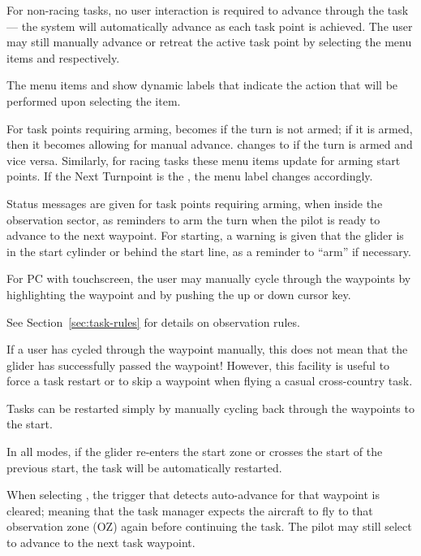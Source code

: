 For non-racing tasks, no user interaction is required to
advance through the task --- the system will automatically advance as
each task point is achieved.  The user may still manually advance or retreat the active
task point by selecting the menu items \blink{} and
\blink{} respectively.

The menu items  and
 show dynamic labels that
indicate the action that will be performed upon selecting the item.

For task points requiring arming,  becomes
 if the turn is not armed; if it is armed, then it becomes
 allowing for manual advance.
 changes to  if the turn is armed
and vice versa. Similarly, for racing tasks these menu items update for arming
start points. If the Next Turnpoint is the , the menu
label changes accordingly.

Status messages are given for task points requiring arming, when
inside the observation sector, as reminders to arm the turn when the
pilot is ready to advance to the next waypoint. For starting, a
warning is given that the glider is in the start cylinder or behind
the start line, as a reminder to ``arm'' if necessary.

For PC with touchscreen, the user may
manually cycle through the waypoints by highlighting the waypoint
and by pushing the up or down cursor key.

See Section~\ref{sec:task-rules} for details on observation rules.

If a user has cycled through the waypoint manually, this does not mean
that the glider has successfully passed the waypoint!  However, this
facility is useful to force a task restart or to skip a waypoint when
flying a casual cross-country task.

\tip{} Tasks can be restarted simply by manually cycling back through the
waypoints to the start.

In all modes, if the glider re-enters the start zone or crosses the
start of the previous start, the task will be automatically restarted.

When selecting , the trigger that detects
auto-advance for that waypoint is cleared; meaning that the task
manager expects the aircraft to fly to that observation zone (OZ)
again before continuing the task. The pilot may still select  to advance to the next task waypoint.

